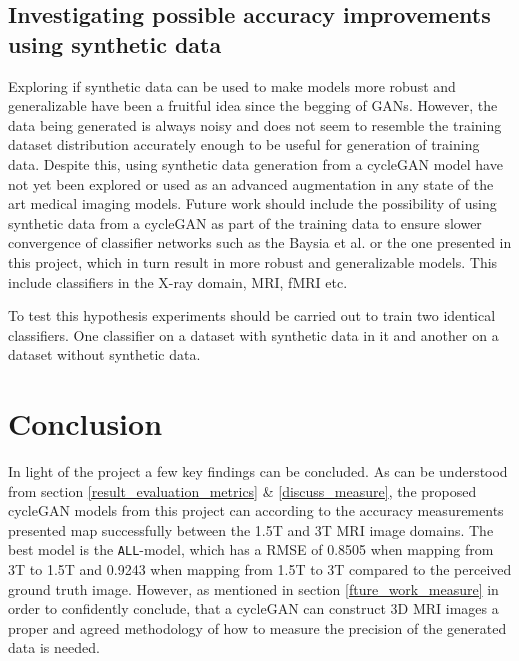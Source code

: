 \documentclass[12pt, fleqn, titlepage]{article}
\newcommand{\1}[1]{\mathds{1}\left[#1\right]}
\begin{document}
\subsection{Investigating possible accuracy improvements using synthetic data}

Exploring if synthetic data can be used to make models more robust and generalizable have been a fruitful idea since the begging of GANs. However, the data being generated is always  noisy and does not seem to resemble the training dataset distribution accurately enough to be useful for generation of training data. Despite this, using synthetic data generation from a cycleGAN model have not yet been explored or used as an advanced augmentation in any state of the art medical imaging models. Future work should include the possibility of using synthetic data from a cycleGAN as part of the training data to ensure slower convergence of classifier networks such as the Baysia et al. or the one presented in this project, which in turn result in more robust and generalizable models. This include classifiers in the X-ray domain, MRI, fMRI etc.

To test this hypothesis experiments should be carried out to train two identical classifiers. One classifier on a dataset with synthetic data in it and another on a dataset without synthetic data. 

\section{Conclusion}\label{conclusion}

In light of the project a few key findings can be concluded. As can be understood from section \ref{result_evaluation_metrics} \& \ref{discuss_measure}, the proposed cycleGAN models from this project can according to the accuracy measurements presented map successfully between the 1.5T and 3T MRI image domains. The best model is the \texttt{ALL}-model, which has a RMSE of 0.8505 when mapping from 3T to 1.5T and 0.9243 when mapping from 1.5T to 3T compared to the perceived ground truth image. However, as mentioned in section \ref{fture_work_measure} in order to confidently conclude, that a cycleGAN can construct 3D MRI images a proper and agreed methodology of how to measure the precision of the generated data is needed. 
\end{document}
